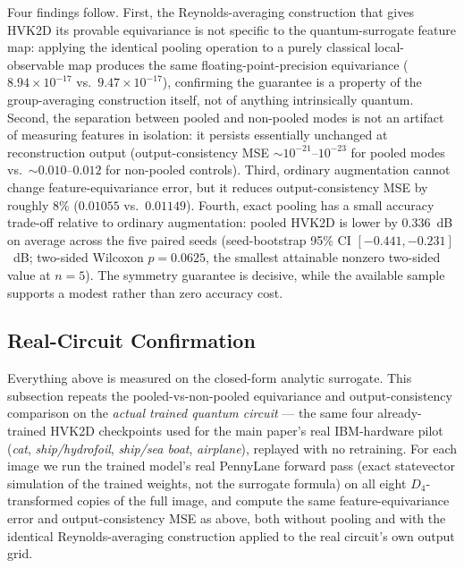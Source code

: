 \documentclass[11pt]{article}
\begin{document}
Four findings follow. First, the Reynolds-averaging construction that gives HVK2D its provable equivariance is not specific to the quantum-surrogate feature map: applying the identical pooling operation to a purely classical local-observable map produces the same floating-point-precision equivariance ($8.94\times10^{-17}$ vs.\ $9.47\times10^{-17}$), confirming the guarantee is a property of the group-averaging construction itself, not of anything intrinsically quantum. Second, the separation between pooled and non-pooled modes is not an artifact of measuring features in isolation: it persists essentially unchanged at reconstruction output (output-consistency MSE $\sim10^{-21}$--$10^{-23}$ for pooled modes vs.\ $\sim0.010$--$0.012$ for non-pooled controls). Third, ordinary augmentation cannot change feature-equivariance error, but it reduces output-consistency MSE by roughly $8\%$ ($0.01055$ vs.\ $0.01149$). Fourth, exact pooling has a small accuracy trade-off relative to ordinary augmentation: pooled HVK2D is lower by $0.336$~dB on average across the five paired seeds (seed-bootstrap 95\% CI $[-0.441,-0.231]$~dB; two-sided Wilcoxon $p=0.0625$, the smallest attainable nonzero two-sided value at $n=5$). The symmetry guarantee is decisive, while the available sample supports a modest rather than zero accuracy cost.

\subsection{Real-Circuit Confirmation}
\label{sec:d4_real_circuit}
Everything above is measured on the closed-form analytic surrogate. This subsection repeats the pooled-vs-non-pooled equivariance and output-consistency comparison on the \emph{actual trained quantum circuit} --- the same four already-trained HVK2D checkpoints used for the main paper's real IBM-hardware pilot (\textit{cat}, \textit{ship/hydrofoil}, \textit{ship/sea boat}, \textit{airplane}), replayed with no retraining. For each image we run the trained model's real PennyLane forward pass (exact statevector simulation of the trained weights, not the surrogate formula) on all eight $D_4$-transformed copies of the full image, and compute the same feature-equivariance error and output-consistency MSE as above, both without pooling and with the identical Reynolds-averaging construction applied to the real circuit's own output grid.
\end{document}
